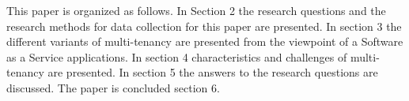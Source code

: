 \documentclass[conference]{sasmoota2017}
\begin{document}
This paper is organized as follows. In Section 2 the research questions and the research methods for data collection for this paper are presented. In section 3 the different variants of multi-tenancy are presented from the viewpoint of a Software as a Service applications. In section 4 characteristics and challenges of multi-tenancy are presented. In section 5 the answers to the research questions are discussed. The paper is concluded section 6. 






% 
%
%
%


%
%
\end{document}
